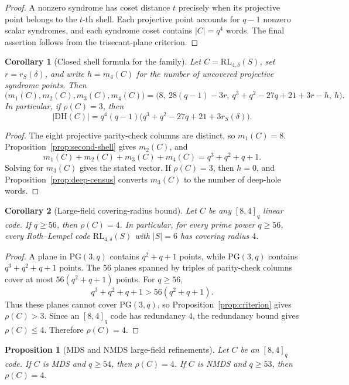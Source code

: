 \documentclass[11pt]{article}
\newcommand{\PG}{\mathrm{PG}}
\newcommand{\RL}{\mathrm{RL}}
\theoremstyle{plain}
\newtheorem{proposition}{Proposition}
\newtheorem{corollary}{Corollary}
\theoremstyle{definition}
\begin{document}
\begin{proof}
A nonzero syndrome has coset distance \(t\) precisely when its projective
point belongs to the \(t\)-th shell.  Each projective point accounts for
\(q-1\) nonzero scalar syndromes, and each syndrome coset contains
\(|C|=q^4\) words.  The final assertion follows from the trisecant-plane
criterion.
\end{proof}

\begin{corollary}[Closed shell formula for the family]
\label{cor:closed-shells}
Let \(C=\RL_{4,\delta}(S)\), set \(r=r_S(\delta)\), and write
\(h=m_4(C)\) for the number of uncovered projective syndrome points.  Then
\[
 \bigl(m_1(C),m_2(C),m_3(C),m_4(C)\bigr)
 =
 \bigl(8,\ 28(q-1)-3r,\ q^3+q^2-27q+21+3r-h,\ h\bigr).
\]
In particular, if \(\rho(C)=3\), then
\[
 |\mathrm{DH}(C)|
 =q^4(q-1)\bigl(q^3+q^2-27q+21+3r_S(\delta)\bigr).
\]
\end{corollary}

\begin{proof}
The eight projective parity-check columns are distinct, so \(m_1(C)=8\).
Proposition~\ref{prop:second-shell} gives \(m_2(C)\), and
\[
 m_1(C)+m_2(C)+m_3(C)+m_4(C)=q^3+q^2+q+1.
\]
Solving for \(m_3(C)\) gives the stated vector.  If \(\rho(C)=3\), then
\(h=0\), and Proposition~\ref{prop:deep-census} converts \(m_3(C)\) to
the number of deep-hole words.
\end{proof}

\begin{corollary}[Large-field covering-radius bound]\label{cor:large-q}
Let \(C\) be any \([8,4]_q\) linear code.  If \(q\ge 56\), then
\(\rho(C)=4\).  In particular, for every prime power \(q\ge 56\), every
Roth--Lempel code \(\RL_{4,\delta}(S)\) with \(|S|=6\) has covering radius
\(4\).
\end{corollary}

\begin{proof}
A plane in \(\PG(3,q)\) contains \(q^2+q+1\) points, while
\(\PG(3,q)\) contains \(q^3+q^2+q+1\) points.  The \(56\) planes spanned by
triples of parity-check columns cover at most \(56(q^2+q+1)\) points.  For
\(q\ge 56\),
\[
  q^3+q^2+q+1>56(q^2+q+1).
\]
Thus these planes cannot cover \(\PG(3,q)\), so
Proposition~\ref{prop:criterion} gives \(\rho(C)>3\).  Since an \([8,4]_q\)
code has redundancy \(4\), the redundancy bound gives \(\rho(C)\le 4\).
Therefore \(\rho(C)=4\).
\end{proof}

\begin{proposition}[MDS and NMDS large-field refinements]\label{prop:large-q-refined}
Let \(C\) be an \([8,4]_q\) code.  If \(C\) is MDS and \(q\ge54\), then
\(\rho(C)=4\).  If \(C\) is NMDS and \(q\ge53\), then
\(\rho(C)=4\).
\end{proposition}
\end{document}
